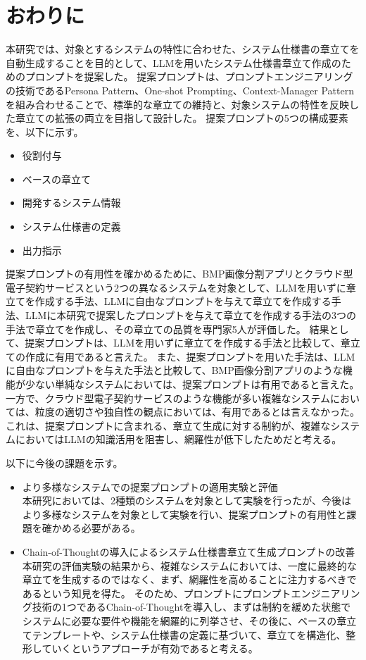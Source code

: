 \chapter{おわりに}\label{cha:Conclusion}

本研究では、対象とするシステムの特性に合わせた、システム仕様書の章立てを自動生成することを目的として、LLMを用いたシステム仕様書章立て作成のためのプロンプトを提案した。
提案プロンプトは、プロンプトエンジニアリングの技術であるPersona Pattern、One-shot Prompting、Context-Manager Patternを組み合わせることで、標準的な章立ての維持と、対象システムの特性を反映した章立ての拡張の両立を目指して設計した。
提案プロンプトの5つの構成要素を、以下に示す。
\begin{itemize}
    \item 役割付与
    \item ベースの章立て
    \item 開発するシステム情報
    \item システム仕様書の定義
    \item 出力指示
\end{itemize}

提案プロンプトの有用性を確かめるために、BMP画像分割アプリとクラウド型電子契約サービスという2つの異なるシステムを対象として、LLMを用いずに章立てを作成する手法、LLMに自由なプロンプトを与えて章立てを作成する手法、LLMに本研究で提案したプロンプトを与えて章立てを作成する手法の3つの手法で章立てを作成し、その章立ての品質を専門家5人が評価した。
結果として、提案プロンプトは、LLMを用いずに章立てを作成する手法と比較して、章立ての作成に有用であると言えた。
また、提案プロンプトを用いた手法は、LLMに自由なプロンプトを与えた手法と比較して、BMP画像分割アプリのような機能が少ない単純なシステムにおいては、提案プロンプトは有用であると言えた。
一方で、クラウド型電子契約サービスのような機能が多い複雑なシステムにおいては、粒度の適切さや独自性の観点においては、有用であるとは言えなかった。
これは、提案プロンプトに含まれる、章立て生成に対する制約が、複雑なシステムにおいてはLLMの知識活用を阻害し、網羅性が低下したためだと考える。

以下に今後の課題を示す。

\begin{itemize}
    \item より多様なシステムでの提案プロンプトの適用実験と評価\\
    本研究においては、2種類のシステムを対象として実験を行ったが、今後はより多様なシステムを対象として実験を行い、提案プロンプトの有用性と課題を確かめる必要がある。
    \item Chain-of-Thoughtの導入によるシステム仕様書章立て生成プロンプトの改善\\
    本研究の評価実験の結果から、複雑なシステムにおいては、一度に最終的な章立てを生成するのではなく、まず、網羅性を高めることに注力するべきであるという知見を得た。
    そのため、プロンプトにプロンプトエンジニアリング技術の1つであるChain-of-Thoughtを導入し、まずは制約を緩めた状態でシステムに必要な要件や機能を網羅的に列挙させ、その後に、ベースの章立てテンプレートや、システム仕様書の定義に基づいて、章立てを構造化、整形していくというアプローチが有効であると考える。
\end{itemize}

